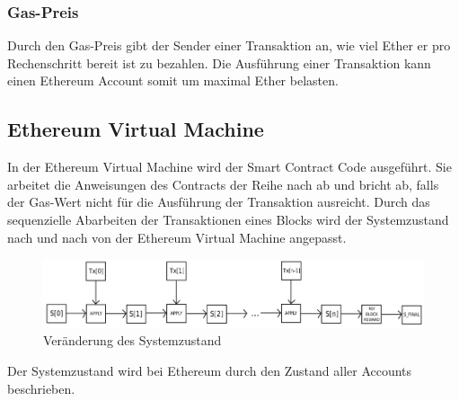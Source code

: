\subsubsection{Gas-Preis}
Durch den Gas-Preis gibt der Sender einer Transaktion an, wie viel Ether er pro Rechenschritt bereit ist zu bezahlen. Die Ausführung einer Transaktion kann einen Ethereum Account somit um maximal  Ether belasten.

\subsection{Ethereum Virtual Machine}
In der Ethereum Virtual Machine wird der Smart Contract Code ausgeführt. Sie arbeitet die Anweisungen des Contracts der Reihe nach ab und bricht ab, falls der Gas-Wert nicht für die Ausführung der Transaktion ausreicht. Durch das sequenzielle Abarbeiten der Transaktionen eines Blocks wird der Systemzustand nach und nach von der Ethereum Virtual Machine angepasst.
\begin{figure}[H]
\centering
\includegraphics[width=1\linewidth]{Figures/eth/ETH_txn_statetransformation}
\decoRule
\caption{Veränderung des Systemzustand}
\label{fig:ETH_txn_statetransformation}
\end{figure}
Der Systemzustand wird bei Ethereum durch den Zustand aller Accounts beschrieben. 

